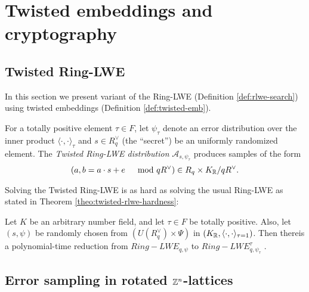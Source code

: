\documentclass[Ingles]{ic-tese-v3}
\begin{document}
\chapter{Twisted embeddings and cryptography}
\label{sec:org9ad39e8}
\section{Twisted Ring-LWE}
\label{sec:orgee007e8}
In this section we present variant of the Ring-LWE (Definition \ref{def:rlwe-search}) using twisted embeddings (Definition \ref{def:twisted-emb}).

\begin{definition}
  \label{def:twisted-ring-lwe}
  For a totally positive element $\tau \in F$, let $\psi_\tau$ denote an error distribution
  over the inner product $\langle{\cdot,\cdot}\rangle_\tau$ and $s \in R^\vee_q$ (the “secret”) be an
  uniformly randomized element. The \emph{Twisted Ring-LWE distribution}
  $\mathcal{A}_{s,\psi_\tau}$ produces samples of the form
  $$
  (a, b = a \cdot s + e \;\;\; \mod{qR^\vee}) \in R_q \times K_{\mathbb{R}}/qR^\vee.
  $$
\end{definition}

Solving the Twisted Ring-LWE is as hard as solving the usual Ring-LWE as stated in Theorem \ref{theo:twisted-rlwe-hardness}:

\begin{theorem}
  \label{theo:twisted-rlwe-hardness}
  Let $K$ be an arbitrary number field, and let $\tau \in F$ be totally positive.
  Also, let $(s,\psi)$ be randomly chosen from $(U(R_q^\vee)\times \Psi)$ in $(K_{\mathbb{R}},\langle{\cdot,\cdot}\rangle_{\tau=1})$.
  Then thereis a polynomial-time reduction from $Ring-LWE_{q,\psi}$ to $Ring-LWE^\tau_{q,\psi_\tau}$ .
\end{theorem}
\section{Error sampling in rotated \(\mathbb{Z}^n\)-lattices}
\label{sec:org8c04363}
\end{document}
